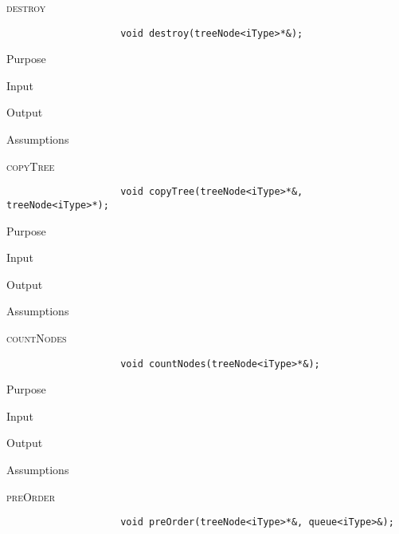 \documentclass[pdftex, 12pt]{article}
\begin{document}
\begin{description}
\begin{description}
\begin{description}
\begin{description}
				\end{description}
			\item{\textsc{destroy}}
				\begin{lstlisting}
					void destroy(treeNode<iType>*&);
				\end{lstlisting}
				\begin{description}

					\item{Purpose}

					\item{Input}

					\item{Output}

					\item{Assumptions}

				\end{description}
			\item{\textsc{copyTree}}
				\begin{lstlisting}
					void copyTree(treeNode<iType>*&, treeNode<iType>*);
				\end{lstlisting}
				\begin{description}

					\item{Purpose}

					\item{Input}

					\item{Output}

					\item{Assumptions}

				\end{description}
			\item{\textsc{countNodes}}
				\begin{lstlisting}
					void countNodes(treeNode<iType>*&);
				\end{lstlisting}
				\begin{description}

					\item{Purpose}

					\item{Input}

					\item{Output}

					\item{Assumptions}

				\end{description}
			\item{\textsc{preOrder}}
				\begin{lstlisting}
					void preOrder(treeNode<iType>*&, queue<iType>&);
				\end{lstlisting}
				\begin{description}


\end{description}
\end{description}
\end{description}
\end{description}
\end{document}
